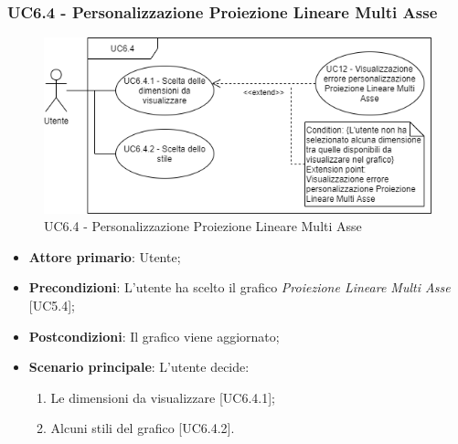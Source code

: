 \subsubsection{UC6.4 - Personalizzazione Proiezione Lineare Multi Asse}
\begin{figure}[h]
\includegraphics[width=\linewidth]{Section/Images/UC6.4.png}
\centering
\caption{UC6.4 - Personalizzazione Proiezione Lineare Multi Asse}
\end{figure}
\begin{itemize}
	\item \textbf{Attore primario}: Utente;
	
	\item \textbf{Precondizioni}: L'utente ha scelto il grafico \textit{Proiezione Lineare Multi Asse} [UC5.4];
	
	\item \textbf{Postcondizioni}: Il grafico viene aggiornato;
	
	\item \textbf{Scenario principale}: L'utente decide:
	
\begin{enumerate}
\item Le dimensioni da visualizzare [UC6.4.1];
\item Alcuni stili del grafico [UC6.4.2].
\end{enumerate}	
		
\end{itemize}